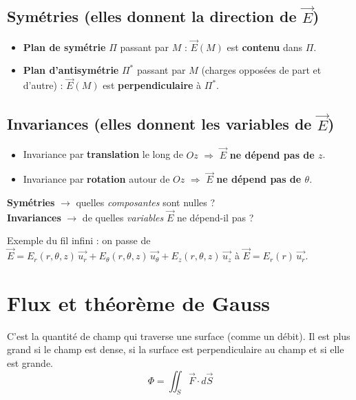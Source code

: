 \documentclass[11pt,a4paper]{article}
\newcommand{\vect}[1]{\overrightarrow{#1}}
\newcommand{\ur}{\vect{u_r}}
\newcommand{\ut}{\vect{u_\theta}}
\newcommand{\uz}{\vect{u_z}}
\newcommand{\E}{\vect{E}}
\begin{document}
\subsection{Symétries (elles donnent la direction de $\E$)}

\begin{formule}
\begin{itemize}
  \item \textbf{Plan de symétrie} $\Pi$ passant par $M$ : $\E(M)$ est \textbf{contenu} dans $\Pi$.
  \item \textbf{Plan d'antisymétrie} $\Pi^*$ passant par $M$ (charges opposées de part et d'autre) : $\E(M)$ est \textbf{perpendiculaire} à $\Pi^*$.
\end{itemize}
\end{formule}

\subsection{Invariances (elles donnent les variables de $\E$)}

\begin{formule}
\begin{itemize}
  \item Invariance par \textbf{translation} le long de $Oz$ $\Rightarrow$ $\E$ \textbf{ne dépend pas de $z$}.
  \item Invariance par \textbf{rotation} autour de $Oz$ $\Rightarrow$ $\E$ \textbf{ne dépend pas de $\theta$}.
\end{itemize}
\end{formule}

\begin{attention}
\textbf{Symétries} $\to$ quelles \emph{composantes} sont nulles ?\\
\textbf{Invariances} $\to$ de quelles \emph{variables} $\E$ ne dépend-il pas ?

\medskip
Exemple du fil infini : on passe de
$\E=E_r(r,\theta,z)\,\ur+E_\theta(r,\theta,z)\,\ut+E_z(r,\theta,z)\,\uz$
à
$\E=E_r(r)\,\ur$.
\end{attention}

\section{Flux et théorème de Gauss}

\begin{idee}
C'est la quantité de champ qui traverse une surface (comme un débit). Il est plus grand si le champ est dense, si la surface est perpendiculaire au champ et si elle est grande.
\[
\Phi=\iint_S \vect{F}\cdot d\vect{S}
\]
\end{idee}
\end{document}
